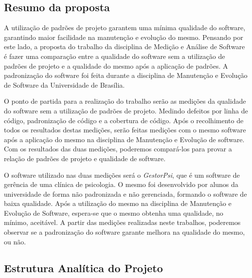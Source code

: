 



\subsection{Resumo da proposta} %
\label{sub:resumo_da_proposta}

A utilização de padrões de projeto garantem uma mínima qualidade do software, garantindo maior facilidade na manutenção e evolução do mesmo. Pensando por este lado, a proposta do trabalho da disciplina de Medição e Análise de Software é fazer uma comparação entre a qualidade do software sem a utilização de padrões de projeto e a qualidade do mesmo após a aplicação de padrões. A padronização do software foi feita durante a disciplina de Manutenção e Evolução de Software da Universidade de Brasília.

O ponto de partida para a realização do trabalho serão as medições da qualidade do software sem a utilização de padrões de projeto. Medindo defeitos por linha de código, padronização de código e a cobertura de código. Após o recolhimento de todos os resultados destas medições, serão feitas medições com o mesmo software após a aplicação do mesmo na disciplina de Manutenção e Evolução de software. Com os resultados das duas medições, poderemos compará-los para provar a relação de padrões de projeto e qualidade de software.

O software utilizado nas duas medições será o \textit{GestorPsi}, que é um software de gerência de uma clínica de psicologia. O mesmo foi desenvolvido por alunos da universidade de forma não padronizada e não gerenciada, formando o software de baixa qualidade. Após a utilização do mesmo na disciplina de Manutenção e Evolução de Software, espera-se que o mesmo obtenha uma qualidade, no mínimo, aceitável. A partir das medições realizadas neste trabalhos, poderemos observar se a padronização do software garante melhora na qualidade do mesmo, ou não.

\subsection{Estrutura Analítica do Projeto} %
\label{sub:estrutura_anal_tica_do_projeto}


